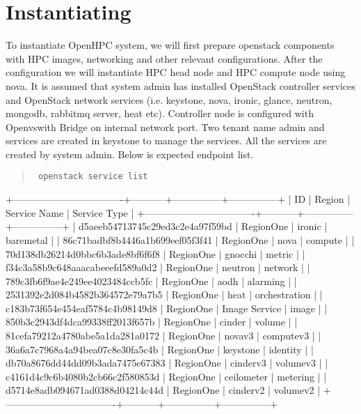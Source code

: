 \documentclass[12pt]{article}
\begin{document}
\newenvironment{bash}
{\begin{quote}
	}
	{ 
	\end{quote}
}
\section[]{Instantiating}

To instantiate OpenHPC system, we will first prepare openstack components with HPC images, networking and other relevant configurations. After the configuration we will instantiate HPC head node and HPC compute node using nova. 
It is assumed that system admin has installed OpenStack controller services and OpenStack network services (i.e. keystone, nova, ironic, glance, neutron, mongodb, rabbitmq server, heat etc). Controller node is configured with Openvswith Bridge on internal network port. Two tenant name admin and services are created in keystone to manage the services. All the services are created by system admin. Below is expected endpoint list.

\begin{bash}\texttt{\small{ openstack service list}}\end{bash}

+----------------------------------+-----------+---------------+---------------+
| ID                               | Region    | Service Name  | Service Type  |
+----------------------------------+-----------+---------------+---------------+
| d5aeeb54713745c29ed3c2e4a97f59bd | RegionOne | ironic        | baremetal     |
| 86c71badbf8b4446a1b699eef05f3f41 | RegionOne | nova          | compute       |
| 70d138db26214d0bbc6b3ade8bf6f6f8 | RegionOne | gnocchi       | metric        |
| f34c3a58b9c648aaacabeeefd589a0d2 | RegionOne | neutron       | network       |
| 789c3fb6f9ae4e249ee4023484ccb5fc | RegionOne | aodh          | alarming      |
| 2531392e2d084b4582b364572e79a7b5 | RegionOne | heat          | orchestration |
| c183b73f654e454eaf5784c4b98149d8 | RegionOne | Image Service | image         |
| 850b3c2943df4dca99338ff2013f657b | RegionOne | cinder        | volume        |
| 81cefa79212a4780abe5a1da281a0172 | RegionOne | novav3        | computev3     |
| 36a6a7c7968a4a94bea07c8e30fa5c4b | RegionOne | keystone      | identity      |
| db70a8676dd44dd09b3ada7475e67383 | RegionOne | cinderv3      | volumev3      |
| c4161d4c9c6b4080b2cb66c2f580853d | RegionOne | ceilometer    | metering      |
| d5714e8adb094671ad0388d04214c44d | RegionOne | cinderv2      | volumev2      |
+----------------------------------+-----------+---------------+---------------+
\end{document}
